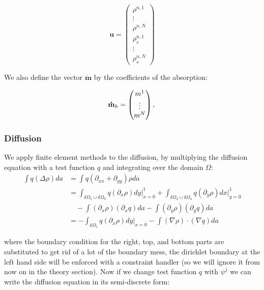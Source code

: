 \begin{equation*}
\mathbf{u} = \begin{pmatrix}\rho^{n, 1} \\ \vdots \\ \rho^{n, N} \\ \rho_s^{n, 1} \\ \vdots \\ \rho_s^{n, N}
\end{pmatrix}
\end{equation*}

We also define the vector $\mathbf{\dot{m}}$ by the coefficients of the absorption:

\begin{equation*}
\mathbf{\dot{m}}_h =\begin{pmatrix}
m^{1}\\ \vdots \\ m^{N}
\end{pmatrix},\\
\end{equation*}

\subsubsection*{Diffusion}
We apply finite element methods to the diffusion, by multiplying the diffusion equation with a test function $q$ and integrating over the domain $\Omega$:
\begin{equation*}
\begin{aligned}
\int q(\Delta\rho)da &= \int q(\partial_{xx}+\partial_{yy})\rho da \\
&= \int_{\delta\Omega_1\cup\delta\Omega_3}q(\partial_x\rho) dy\bigg|_{x=0}^1+\int_{\delta\Omega_2\cup\delta\Omega_4}q(\partial_y\rho) dx\bigg|_{y=0}^1\\
&\quad -\int (\partial_x\rho)(\partial_xq)da-\int (\partial_y\rho)(\partial_y q)da \\
&= -\int_{\delta\Omega_1}q(\partial_x\rho) dy\bigg|_{x=0}-\int (\nabla\rho)\cdot(\nabla q)da
\end{aligned}
\end{equation*}

where the boundary condition for the right, top, and bottom parts are substituted to get rid of a lot of the boundary mess, the dirichlet boundary at the left hand side will be enforced with a constraint handler (so we will ignore it from now on in the theory section). Now if we change test function $q$ with $\psi^j$ we can write the diffusion equation in its semi-discrete form:

